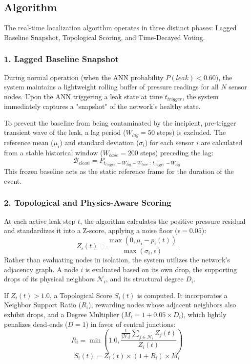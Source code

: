 \documentclass[final,5p,times,twocolumn,authoryear]{elsarticle}
\begin{document}
\subsection{Algorithm}
The real-time localization algorithm operates in three distinct phases: Lagged Baseline Snapshot, Topological Scoring, and Time-Decayed Voting.

\subsubsection{1. Lagged Baseline Snapshot}
During normal operation (when the ANN probability $P(leak) < 0.60$), the system maintains a lightweight rolling buffer of pressure readings for all $N$ sensor nodes. Upon the ANN triggering a leak state at time $t_{trigger}$, the system immediately captures a "snapshot" of the network's healthy state.

To prevent the baseline from being contaminated by the incipient, pre-trigger transient wave of the leak, a lag period ($W_{lag} = 50$ steps) is excluded. The reference mean ($\mu_i$) and standard deviation ($\sigma_i$) for each sensor $i$ are calculated from a stable historical window ($W_{base} = 200$ steps) preceding the lag:
\begin{equation}
    \mathcal{B}_{clean} = P_{t_{trigger} - W_{lag} - W_{base} \ : \ t_{trigger} - W_{lag}}
\end{equation}
This frozen baseline acts as the static reference frame for the duration of the event.

\subsubsection{2. Topological and Physics-Aware Scoring}
At each active leak step $t$, the algorithm calculates the positive pressure residual and standardizes it into a Z-score, applying a noise floor ($\epsilon = 0.05$):
\begin{equation}
    Z_i(t) = \frac{\max(0, \mu_i - p_i(t))}{\max(\sigma_i, \epsilon)}
\end{equation}
Rather than evaluating nodes in isolation, the system utilizes the network's adjacency graph. A node $i$ is evaluated based on its own drop, the supporting drops of its physical neighbors $\mathcal{N}_i$, and its structural degree $D_i$.

If $Z_i(t) > 1.0$, a Topological Score $S_i(t)$ is computed. It incorporates a Neighbor Support Ratio ($R_i$), rewarding nodes whose adjacent neighbors also exhibit drops, and a Degree Multiplier ($M_i = 1 + 0.05 \times D_i$), which lightly penalizes dead-ends ($D=1$) in favor of central junctions:
\begin{equation}
    R_i = \min\left(1.0, \frac{\frac{1}{|\mathcal{N}_i|} \sum_{j \in \mathcal{N}_i} Z_j(t)}{Z_i(t)}\right)
\end{equation}
\begin{equation}
    S_i(t) = Z_i(t) \times (1 + R_i) \times M_i
\end{equation}
\end{document}
